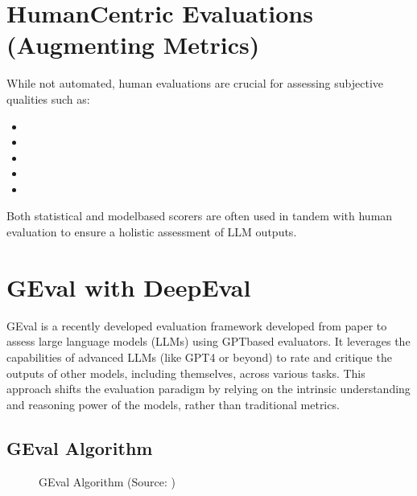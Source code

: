 \documentclass[letterpaper,11pt,english]{sphinxmanual}
\begin{document}
\section{Human\sphinxhyphen{}Centric Evaluations (Augmenting Metrics)}
\label{\detokenize{evaluation:human-centric-evaluations-augmenting-metrics}}
\sphinxAtStartPar
While not automated, human evaluations are crucial for assessing subjective qualities such as:
\begin{itemize}
\item {} 
\sphinxAtStartPar
{}

\item {} 
\sphinxAtStartPar
{}

\item {} 
\sphinxAtStartPar
{}

\item {} 
\sphinxAtStartPar
{}

\item {} 
\sphinxAtStartPar
{}

\end{itemize}

\sphinxAtStartPar
Both statistical and model\sphinxhyphen{}based scorers are often used in tandem with human evaluation to ensure a holistic assessment of LLM outputs.


\section{GEval with DeepEval}
\label{\detokenize{evaluation:geval-with-deepeval}}\label{\detokenize{evaluation:sec-geval}}
\sphinxAtStartPar
G\sphinxhyphen{}Eval is a recently developed evaluation framework developed from paper  to assess large language models (LLMs) using GPT\sphinxhyphen{}based evaluators.
It leverages the capabilities of advanced LLMs (like GPT\sphinxhyphen{}4 or beyond) to rate and critique the outputs of other models, including themselves,
across various tasks. This approach shifts the evaluation paradigm by relying on the intrinsic understanding and reasoning power of the models,
rather than traditional metrics.


\subsection{G\sphinxhyphen{}Eval Algorithm}
\label{\detokenize{evaluation:g-eval-algorithm}}
\begin{figure}[htbp]
\centering
\capstart

\noindent{}
\caption{G\sphinxhyphen{}Eval Algorithm (Source: )}\label{\detokenize{evaluation:id4}}\label{\detokenize{evaluation:fig-geval}}\end{figure}
\end{document}
